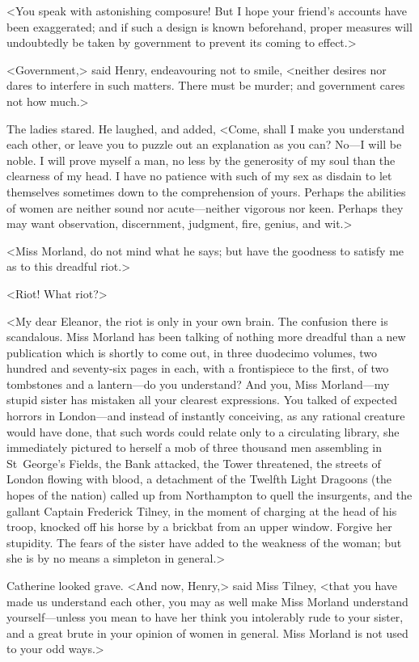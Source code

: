  <You speak with astonishing composure! But I hope your friend's accounts have been exaggerated; and if such a design is known beforehand, proper measures will undoubtedly be taken by government to prevent its coming to effect.> 

 <Government,> said Henry, endeavouring not to smile, <neither desires nor dares to interfere in such matters. There must be murder; and government cares not how much.> 

 The ladies stared. He laughed, and added, <Come, shall I make you understand each other, or leave you to puzzle out an explanation as you can? No—I will be noble. I will prove myself a man, no less by the generosity of my soul than the clearness of my head. I have no patience with such of my sex as disdain to let themselves sometimes down to the comprehension of yours. Perhaps the abilities of women are neither sound nor acute—neither vigorous nor keen. Perhaps they may want observation, discernment, judgment, fire, genius, and wit.> 

 <Miss Morland, do not mind what he says; but have the goodness to satisfy me as to this dreadful riot.> 

 <Riot! What riot?> 

 <My dear Eleanor, the riot is only in your own brain. The confusion there is scandalous. Miss Morland has been talking of nothing more dreadful than a new publication which is shortly to come out, in three duodecimo volumes, two hundred and seventy-six pages in each, with a frontispiece to the first, of two tombstones and a lantern—do you understand? And you, Miss Morland—my stupid sister has mistaken all your clearest expressions. You talked of expected horrors in London—and instead of instantly conceiving, as any rational creature would have done, that such words could relate only to a circulating library, she immediately pictured to herself a mob of three thousand men assembling in St~George's Fields, the Bank attacked, the Tower threatened, the streets of London flowing with blood, a detachment of the Twelfth Light Dragoons (the hopes of the nation) called up from Northampton to quell the insurgents, and the gallant Captain Frederick Tilney, in the moment of charging at the head of his troop, knocked off his horse by a brickbat from an upper window. Forgive her stupidity. The fears of the sister have added to the weakness of the woman; but she is by no means a simpleton in general.> 

 Catherine looked grave. <And now, Henry,> said Miss Tilney, <that you have made us understand each other, you may as well make Miss Morland understand yourself—unless you mean to have her think you intolerably rude to your sister, and a great brute in your opinion of women in general. Miss Morland is not used to your odd ways.> 

